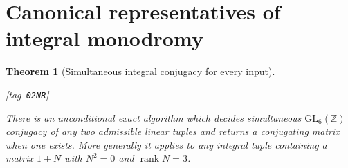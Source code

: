 \documentclass[11pt,a4paper]{article}
\numberwithin{equation}{section}
\newtheorem{theorem}{Theorem}[section]
\theoremstyle{definition}
\newcommand{\StatementRecord}[4]{{\upshape\footnotesize[tag~\texttt{#3}]}\enspace\ignorespaces}
\begin{document}
\section{Canonical representatives of integral monodromy}\label{pub:V:sec-canonical}

\begin{theorem}[Simultaneous integral conjugacy for every input]\hypertarget{tag-02NR}{}\label{maps:src:F.2.36}
\StatementRecord{maps:src:F.2.36}{proved}{02NR}{\cite[Algorithm 8.3, p.~21]{rootBHJ22}; \cite[Algorithm 8.3 and its correctness proof, p.~21]{rootBHJ22}; \cite[Theorem 3.4, p.~6; Propositions 8.1--8.2, p.~21]{rootBHJ22}}


There is an unconditional exact algorithm which decides simultaneous
$\mathrm{GL}_6(\mathbb Z)$ conjugacy of any two admissible linear tuples and returns a conjugating matrix when one exists.  More generally it applies to any integral
tuple containing a matrix $1+N$ with $N^2=0$ and $\operatorname{rank}N=3$.

\end{theorem}
\end{document}
